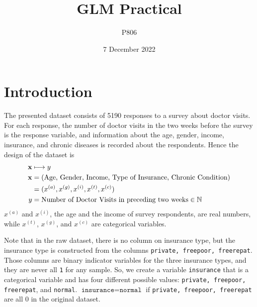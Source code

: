 \documentclass[a4paper,11pt]{article}
\title{GLM Practical}
\author{P806}
\date{7 December 2022}
\begin{document}
\newcommand{\E}{\mathrm{E}}

\newcommand{\Var}{\mathrm{Var}}

\newcommand{\Cov}{\mathrm{Cov}}

\maketitle

\section{Introduction}
The presented dataset consists of 5190 responses to a survey about doctor visits. For each response, the number of doctor visits in the two weeks before the survey is the response variable, and information about the age, gender, income, insurance, and chronic diseases is recorded about the respondents. Hence the design of the dataset is
\begin{align*}
\centering
\mathbf{x}  & \longmapsto y \\
\mathbf{x} &= (\text{Age, Gender, Income, Type of Insurance, Chronic Condition}) \\
 &= (x^{(a)}, x^{(g)}, x^{(i)}, x^{(t)}, x^{(c)}) \\
y &= \text{Number of Doctor Visits in preceding two weeks} \in \mathbb{N}
\end{align*}
$x^{(a)}$ and $x^{(i)}$, the age and the income of survey respondents, are real numbers, while $x^{(t)}$, $x^{(g)}$, and $x^{(c)}$ are categorical variables.

Note that in the raw dataset, there is no column on insurance type, but the insurance type is constructed from the columns \texttt{private, freepoor, freerepat}. Those columns are binary indicator variables for the three insurance types, and they are never all \texttt{1} for any sample. So, we create a variable \texttt{insurance} that is a categorical variable and has four different possible values: \texttt{private, freepoor, freerepat}, and \texttt{normal}. $\texttt{insurance} = \texttt{normal}$  if \texttt{private, freepoor, freerepat} are all $0$ in the original dataset.
\end{document}
